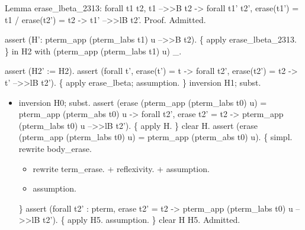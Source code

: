     Lemma erase\_lbeta\_2313: forall t1 t2, t1 -->>B t2 -> forall t1' t2', erase(t1') = t1 / erase(t2') = t2 -> t1' -->>lB t2'.
    Proof.
      Admitted.


    assert (H': pterm\_app (pterm\_labs t1) u -->>B t2).
    \{
      apply erase\_lbeta\_2313.
    \}
     in H2 with (pterm\_app (pterm\_labs t1) u) \_.




  assert (H2' := H2).
  assert (forall t', erase(t') = t -> forall t2', erase(t2') = t2 -> t' -->>lB t2').
  \{
    apply erase\_lbeta; assumption.   
  \}
  inversion H1; subst.

\begin{itemize}
\item  inversion H0; subst.
    assert (erase (pterm\_app (pterm\_labs t0) u) = pterm\_app (pterm\_abs t0) u -> forall t2', erase t2' = t2 -> pterm\_app (pterm\_labs t0) u -->>lB t2').
    \{
      apply H.
    \}
    clear H.
    assert (erase (pterm\_app (pterm\_labs t0) u) = pterm\_app (pterm\_abs t0) u).
    \{
      simpl.
      rewrite body\_erase.

\begin{itemize}
\item  rewrite term\_erase.
        + reflexivity.
        + assumption.

\item  assumption.

\end{itemize}
    \}
    assert (forall t2' : pterm, erase t2' = t2 -> pterm\_app (pterm\_labs t0) u -->>lB t2').
    \{
      apply H5.
      assumption.
    \}
    clear H H5.
    Admitted.

\end{itemize}




\begin{coqdoccode}
\end{coqdoccode}
